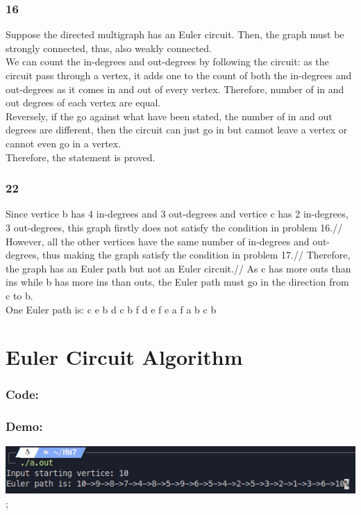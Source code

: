 \documentclass[12pt]{article}
\begin{document}
\begin{multicols}{2}
    \section*{16}
      Suppose the directed multigraph has an Euler circuit. Then, the graph must be strongly connected, thus, also weakly connected.\\
      We can count the in-degrees and out-degrees by following the circuit: as the circuit pass through a vertex, it adds one to the count of both the in-degrees and out-degrees as it comes in and out of every vertex. Therefore, number of in and out degrees of each vertex are equal.\\
      Reversely, if the go against what have been stated, the number of in and out degrees are different, then the circuit can just go in but cannot leave a vertex or cannot even go in a vertex.\\
      Therefore, the statement is proved.
    \section*{22}
      Since vertice b has 4 in-degrees and 3 out-degrees and vertice c has 2 in-degrees, 3 out-degrees, this graph firstly does not satisfy the condition in problem 16.//
      However, all the other vertices have the same number of in-degrees and out-degrees, thus making the graph satisfy the condition in problem 17.//
      Therefore, the graph has an Euler path but not an Euler circuit.//
      As c has more outs than ins while b has more ins than outs, the Euler path must go in the direction from c to b.\\
      One Euler path is: c e b d c b f d e f e a f a b c b
  \end{multicols}

  \part*{Euler Circuit Algorithm}
    \section*{Code:}
      
    \section*{Demo:}
      \begin{center}
        \includegraphics{EulerResult.png};
      \end{center}
\end{document}
